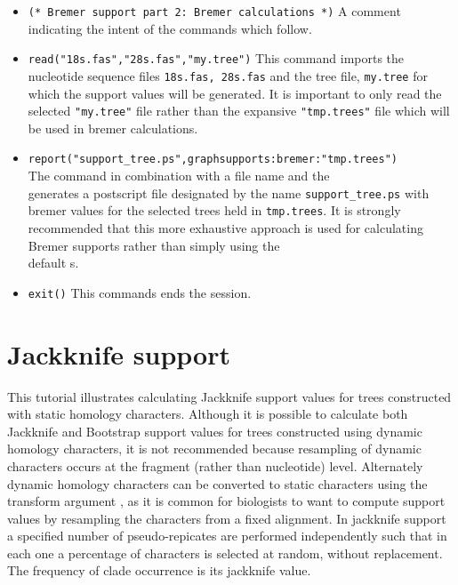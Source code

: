 \begin{itemize}
\item \texttt{(* Bremer support part 2: Bremer calculations *)}  A comment indicating the intent of the commands which follow.
\item \texttt{read("18s.fas","28s.fas","my.tree")} This command imports the nucleotide sequence files \texttt{18s.fas, 28s.fas} and the tree file, \texttt{my.tree} for which the support values will be generated.  It is important to only read the selected \texttt{"my.tree"} file rather than the expansive  \texttt{"tmp.trees"} file which will be used in bremer calculations.
\item \texttt{report("support\_tree.ps",graphsupports:bremer:"tmp.trees")} \\The {} command in combination with a file name and the \\  generates a postscript file designated by the name \texttt{support\_tree.ps} with bremer values for the selected trees held in \texttt{tmp.trees}.  It is strongly recommended that this more exhaustive approach is used for calculating Bremer supports rather than simply using the \\  default s.  
\item \texttt{exit()} This commands ends the \poy session.
\end{itemize}

\section{Jackknife support}{\label{tutorial4.4}}

This tutorial illustrates calculating Jackknife support values for trees constructed with static homology characters.  Although it is possible to calculate both Jackknife and Bootstrap support values for trees constructed using dynamic homology characters, it is not recommended because resampling of dynamic characters occurs at the fragment (rather than nucleotide) level. Alternately dynamic homology characters can be converted to static characters using the transform argument , as it is common for biologists to want to  compute support values by resampling the characters from a fixed alignment.  In jackknife support a specified number of pseudo-repicates are performed independently such that in each one a percentage of characters is selected at random, without replacement.  The frequency of clade occurrence is its jackknife value.  


